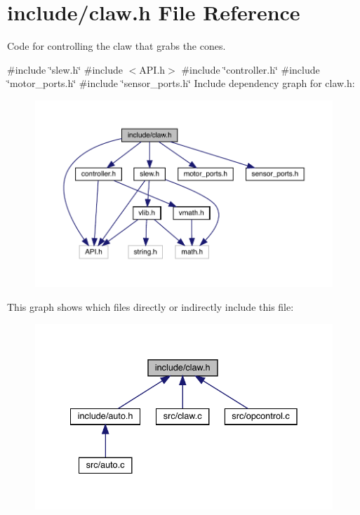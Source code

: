 \section{include/claw.h File Reference}
\label{claw_8h}


Code for controlling the claw that grabs the cones.  


{\ttfamily \#include \char`\"{}slew.\+h\char`\"{}}\newline
{\ttfamily \#include $<$A\+P\+I.\+h$>$}\newline
{\ttfamily \#include \char`\"{}controller.\+h\char`\"{}}\newline
{\ttfamily \#include \char`\"{}motor\+\_\+ports.\+h\char`\"{}}\newline
{\ttfamily \#include \char`\"{}sensor\+\_\+ports.\+h\char`\"{}}\newline
Include dependency graph for claw.\+h\+:
\nopagebreak
\begin{figure}[H]
\begin{center}
\leavevmode
\includegraphics[width=350pt]{claw_8h__incl}
\end{center}
\end{figure}
This graph shows which files directly or indirectly include this file\+:
\nopagebreak
\begin{figure}[H]
\begin{center}
\leavevmode
\includegraphics[width=335pt]{claw_8h__dep__incl}
\end{center}
\end{figure}
